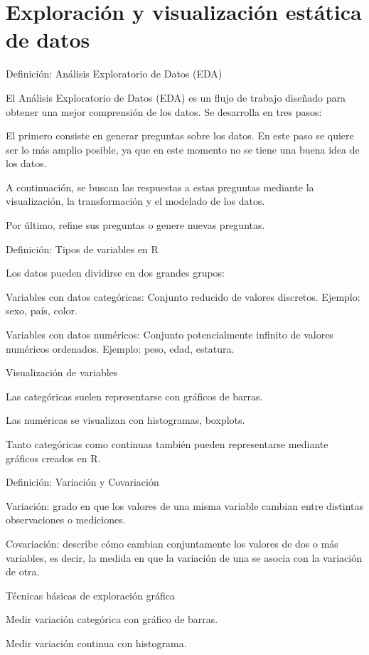 \documentclass[
]{book}
\begin{document}
\chapter{Exploración y visualización estática de datos}\label{vizestatico}

{} Definición: Análisis Exploratorio de Datos (EDA)

El Análisis Exploratorio de Datos (EDA) es un flujo de trabajo diseñado para obtener una mejor comprensión de los datos.
Se desarrolla en tres pasos:

El primero consiste en generar preguntas sobre los datos. En este paso se quiere ser lo más amplio posible, ya que en este momento no se tiene una buena idea de los datos.

A continuación, se buscan las respuestas a estas preguntas mediante la visualización, la transformación y el modelado de los datos.

Por último, refine sus preguntas o genere nuevas preguntas.

{} Definición: Tipos de variables en R

Los datos pueden dividirse en dos grandes grupos:

Variables con datos categóricas: Conjunto reducido de valores discretos. Ejemplo: sexo, país, color.

Variables con datos numéricos: Conjunto potencialmente infinito de valores numéricos ordenados. Ejemplo: peso, edad, estatura.

{} Visualización de variables

Las categóricas suelen representarse con gráficos de barras.

Las numéricas se visualizan con histogramas, boxplots.

Tanto categóricas como continuas también pueden representarse mediante gráficos creados en R.

{} Definición: Variación y Covariación

Variación: grado en que los valores de una misma variable cambian entre distintas observaciones o mediciones.

Covariación: describe cómo cambian conjuntamente los valores de dos o más variables, es decir, la medida en que la variación de una se asocia con la variación de otra.

{} Técnicas básicas de exploración gráfica

Medir variación categórica con gráfico de barras.

Medir variación continua con histograma.
\end{document}

